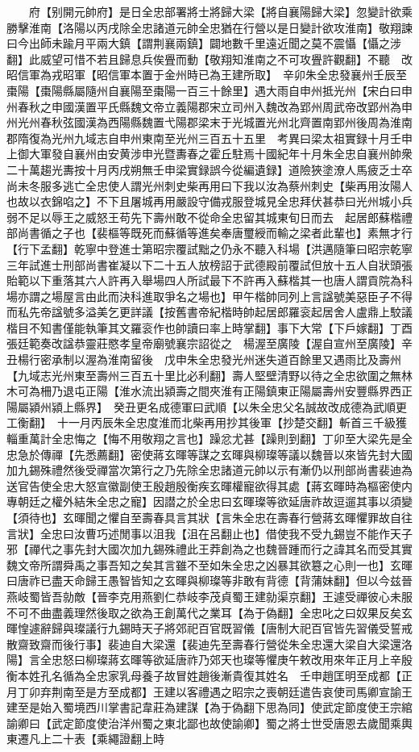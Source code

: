 　　府【别開元帥府】是日全忠部署將士將歸大梁【將自襄陽歸大梁】忽變計欲乘勝擊淮南【洛陽以丙戌除全忠諸道元帥全忠猶在行營以是日變計欲攻淮南】敬翔諫曰今出師未踰月平兩大鎮【謂荆襄兩鎮】闢地數千里遠近聞之莫不震懾【懾之涉翻】此威望可惜不若且歸息兵俟舋而動【敬翔知淮南之不可攻舋許觀翻】不聽　改昭信軍為戎昭軍【昭信軍本置于金州時已為王建所取】　辛卯朱全忠發襄州壬辰至棗陽【棗陽縣屬隨州自襄陽至棗陽一百三十餘里】遇大雨自申州抵光州【宋白曰申州春秋之申國漢置平氏縣魏文帝立義陽郡宋立司州入魏改為郢州周武帝改郢州為申州光州春秋弦國漢為西陽縣魏置弋陽郡梁末于光城置光州北齊置南郢州後周為淮南郡隋復為光州九域志自申州東南至光州三百五十五里　考異曰梁太祖實録十月壬申上御大軍發自襄州由安黄涉申光暨夀春之霍丘駐焉十國紀年十月朱全忠自襄州帥衆二十萬趨光夀按十月丙戌朔無壬申梁實録誤今從編遺録】道險狹塗潦人馬疲乏士卒尚未冬服多逃亡全忠使人謂光州刺史柴再用曰下我以汝為蔡州刺史【柴再用汝陽人也故以衣錦啗之】不下且屠城再用嚴設守備戎服登城見全忠拜伏甚恭曰光州城小兵弱不足以辱王之威怒王苟先下壽州敢不從命全忠留其城東旬日而去　起居郎蘇楷禮部尚書循之子也【裴樞等既死而蘇循等進矣奉唐璽綬而輸之梁者此輩也】素無才行【行下孟翻】乾寧中登進士第昭宗覆試黜之仍永不聽入科場【洪邁隨筆曰昭宗乾寧三年試進士刑部尚書崔凝以下二十五人放榜詔于武德殿前覆試但放十五人自狀頭張貽範以下重落其六人許再入舉場四人所試最下不許再入蘇楷其一也唐人謂貢院為科場亦謂之場屋言由此而決科進取爭名之場也】甲午楷帥同列上言諡號美惡臣子不得而私先帝諡號多溢美乞更詳議【按舊書帝紀楷時帥起居郎羅衮起居舍人盧鼎上駮議楷目不知書僅能執筆其文羅衮作也帥讀曰率上時掌翻】事下大常【下戶嫁翻】丁酉張廷範奏改諡恭靈莊愍孝皇帝廟號襄宗詔從之　楊渥至廣陵【渥自宣州至廣陵】辛丑楊行密承制以渥為淮南留後　戊申朱全忠發光州迷失道百餘里又遇雨比及壽州【九域志光州東至壽州三百五十里比必利翻】壽人堅壁清野以待之全忠欲圍之無林木可為柵乃退屯正陽【淮水流出潁壽之間夾淮有正陽鎮東正陽屬壽州安豐縣界西正陽屬潁州潁上縣界】　癸丑更名成德軍曰武順【以朱全忠父名誠故改成德為武順更工衡翻】　十一月丙辰朱全忠度淮而北柴再用抄其後軍【抄楚交翻】斬首三千級獲輜重萬計全忠悔之【悔不用敬翔之言也】躁忿尤甚【躁則到翻】丁卯至大梁先是全忠急於傳禪【先悉薦翻】密使蔣玄暉等謀之玄暉與柳璨等議以魏晉以來皆先封大國加九錫殊禮然後受禪當次第行之乃先除全忠諸道元帥以示有漸仍以刑部尚書裴迪為送官告使全忠大怒宣徽副使王殷趙殷衡疾玄暉權寵欲得其處【蔣玄暉時為樞密使内專朝廷之權外結朱全忠之寵】因譛之於全忠曰玄暉璨等欲延唐祚故逗遛其事以須變【須待也】玄暉聞之懼自至壽春具言其狀【言朱全忠在壽春行營蔣玄暉懼罪故自往言狀】全忠曰汝曹巧述閒事以沮我【沮在呂翻止也】借使我不受九錫豈不能作天子邪【禪代之事先封大國次加九錫殊禮此王莽創為之也魏晉踵而行之諱其名而受其實魏文帝所謂舜禹之事吾知之矣其言雖不至如朱全忠之凶暴其欲簒之心則一也】玄暉曰唐祚已盡天命歸王愚智皆知之玄暉與柳璨等非敢有背德【背蒲妹翻】但以今兹晉燕岐蜀皆吾勍敵【晉李克用燕劉仁恭岐李茂貞蜀王建勍渠京翻】王遽受禪彼心未服不可不曲盡義理然後取之欲為王創萬代之業耳【為于偽翻】全忠叱之曰奴果反矣玄暉惶遽辭歸與璨議行九錫時天子將郊祀百官既習儀【唐制大祀百官皆先習儀受誓戒散齋致齋而後行事】裴迪自大梁還【裴迪先至壽春行營從朱全忠還大梁自大梁還洛陽】言全忠怒曰柳璨蔣玄暉等欲延唐祚乃郊天也璨等懼庚午敕改用來年正月上辛殷衡本姓孔名循為全忠家乳母養子故冒姓趙後漸貴復其姓名　壬申趙匡明至成都【正月丁卯弃荆南至是方至成都】王建以客禮遇之昭宗之喪朝廷遣告哀使司馬卿宣諭王建至是始入蜀境西川掌書記韋莊為建謀【為于偽翻下思為同】使武定節度使王宗綰諭卿曰【武定節度使治洋州蜀之東北鄙也故使諭卿】蜀之將士世受唐恩去歲聞乘輿東遷凡上二十表【乘繩證翻上時